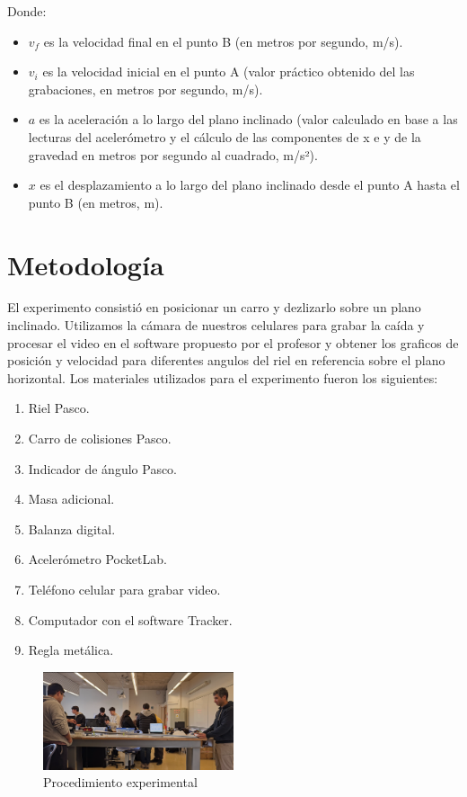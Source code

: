 \documentclass[twocolumn,12pt]{article}
\begin{document}
	Donde:
	\begin{itemize}
		\item \(v_f\) es la velocidad final en el punto B (en metros por segundo, m/s).
		\item \(v_i\) es la velocidad inicial en el punto A (valor práctico obtenido del las grabaciones, en metros por segundo, m/s).
		\item \(a\) es la aceleración a lo largo del plano inclinado (valor calculado en base a las lecturas del acelerómetro y el cálculo de las componentes de x e y de la gravedad en metros por segundo al cuadrado, m/s²).
		\item \(x\) es el desplazamiento a lo largo del plano inclinado desde el punto A hasta el punto B (en metros, m).
	\end{itemize}
	
	\section{Metodología}
	El experimento consistió en posicionar un carro y dezlizarlo sobre un plano inclinado. Utilizamos la cámara de nuestros celulares para grabar la caída y procesar el video en el software propuesto por el profesor y obtener los graficos de posición y velocidad para diferentes angulos del riel en referencia sobre el plano horizontal. Los materiales utilizados para el experimento fueron los siguientes:
	
	\begin{enumerate}
	\item Riel Pasco.
	\item Carro de colisiones Pasco.
	\item Indicador de ángulo Pasco.
	\item Masa adicional.
	\item Balanza digital.
	\item Acelerómetro PocketLab.
	\item Teléfono celular para grabar video.
	\item Computador con el software Tracker. 
	\item Regla metálica.
	\end{enumerate}	
	
	\begin{figure}[h]
	\centering
	\includegraphics[width=0.5\textwidth]{./Multimedia/fotografia_laboratorio.png}
	\caption{ Procedimiento experimental}
	\label{Imagen:mi_imagen}
	\end{figure}
	
\end{document}
